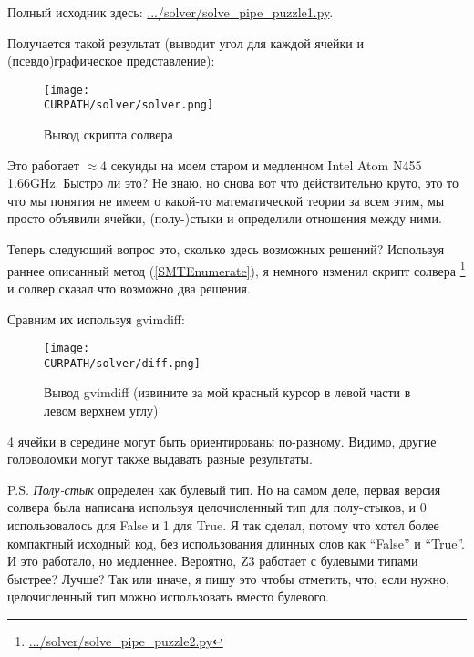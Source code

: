 Полный исходник здесь: \url{.../solver/solve_pipe_puzzle1.py}.

Получается такой результат (выводит угол для каждой ячейки и (псевдо)графическое представление):

\begin{figure}[H]
\centering
\texttt{[image: \\CURPATH/solver/solver.png]}
\caption{Вывод скрипта солвера}
\end{figure}

Это работает $\approx 4$ секунды на моем старом и медленном Intel Atom N455 1.66GHz.
Быстро ли это? Не знаю, но снова вот что действительно круто, это то что мы понятия не имеем о какой-то математической
теории за всем этим, мы просто объявили ячейки, (полу-)стыки и определили отношения между ними.

Теперь следующий вопрос это, сколько здесь возможных решений?
Используя раннее описанный метод (\ref{SMTEnumerate}), я немного изменил скрипт солвера
\footnote{\url{.../solver/solve_pipe_puzzle2.py}} и солвер
сказал что возможно два решения.

Сравним их используя gvimdiff:

\begin{figure}[H]
\centering
\texttt{[image: \\CURPATH/solver/diff.png]}
\caption{Вывод gvimdiff (извините за мой красный курсор в левой части в левом верхнем углу)}
\end{figure}

4 ячейки в середине могут быть ориентированы по-разному.
Видимо, другие головоломки могут также выдавать разные результаты.

P.S.
\textit{Полу-стык} определен как булевый тип.
Но на самом деле, первая версия солвера была написана используя целочисленный тип для полу-стыков,
и 0 использовалось для False и 1 для True.
Я так сделал, потому что хотел более компактный исходный код, без использования длинных слов как ``False'' и ``True''.
И это работало, но медленнее. Вероятно, Z3 работает с булевыми типами быстрее? Лучше?
Так или иначе, я пишу это чтобы отметить, что, если нужно, целочисленный тип можно использовать вместо булевого.

